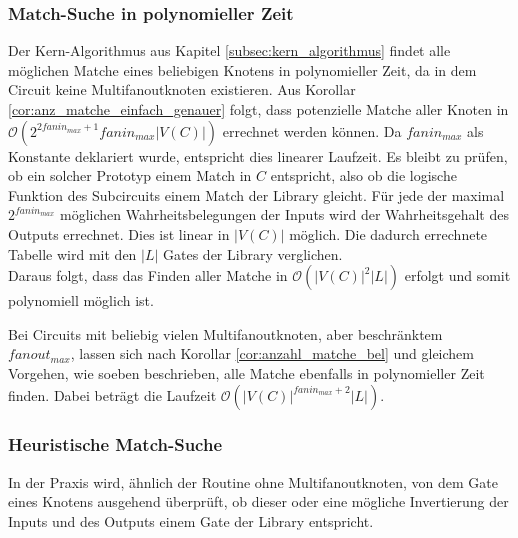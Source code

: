 \documentclass[11pt, a4paper, german]{article}
\begin{document}
\subsubsection{Match-Suche in polynomieller Zeit}
\label{subsubsec:pol_match_suche}
Der Kern-Algorithmus aus Kapitel \ref{subsec:kern_algorithmus} findet alle möglichen Matche eines beliebigen Knotens in polynomieller Zeit, da in dem Circuit keine Multifanoutknoten existieren. Aus Korollar \ref{cor:anz_matche_einfach_genauer} folgt, dass potenzielle Matche aller Knoten  in $\mathcal{O}(2^{2fanin_{max} +1}fanin_{max} |V(C)|)$ errechnet werden können. Da $fanin_{max}$ als Konstante deklariert wurde, entspricht dies linearer Laufzeit. Es bleibt zu prüfen, ob  ein solcher Prototyp einem Match in $C$ entspricht, also ob die logische Funktion des Subcircuits einem Match der Library gleicht. Für jede der maximal $2^{fanin_{max}}$ möglichen Wahrheitsbelegungen der Inputs wird der Wahrheitsgehalt des Outputs errechnet. Dies ist linear in $|V(C)|$ möglich. Die dadurch errechnete Tabelle wird mit den $|L|$ Gates der Library verglichen. \\
Daraus folgt, dass das Finden aller Matche in $\mathcal{O}(|V(C)|^2|L|)$ erfolgt und somit polynomiell möglich ist.

Bei Circuits mit beliebig vielen Multifanoutknoten, aber beschränktem \\$fanout_{max}$, lassen sich nach Korollar \ref{cor:anzahl_matche_bel} und gleichem Vorgehen, wie soeben beschrieben, alle Matche ebenfalls in polynomieller Zeit finden. Dabei beträgt die Laufzeit $\mathcal{O}(|V(C)|^{fanin_{max}+2}|L|)$.

\subsubsection{Heuristische Match-Suche}
In der Praxis wird, ähnlich der Routine ohne Multifanoutknoten, von dem Gate eines Knotens ausgehend überprüft, ob dieser oder eine mögliche Invertierung der Inputs und des Outputs einem Gate der Library entspricht. 
\end{document}
